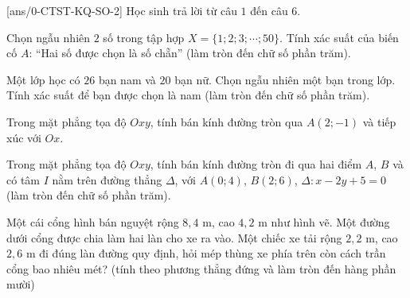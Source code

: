 \caukq
{}[ans/0-CTST-KQ-SO-2]
\setcounter{ex}{0}
Học sinh trả lời từ câu $1$ đến câu $6$.
\begin{ex}%
Chọn ngẫu nhiên $2$ số trong tập hợp $X=\{1;2;3;\cdots ; 50\}$. Tính xác suất của biến cố $A$: ``Hai số được chọn là số chẵn'' (làm tròn đến chữ số phần trăm).
	\loigiai{
	}
\end{ex}

\begin{ex}%
Một lớp học có $26$ bạn nam và $20$ bạn nữ. Chọn ngẫu nhiên một bạn trong lớp. Tính xác suất để bạn được chọn là nam (làm tròn đến chữ số phần trăm).
	\loigiai{
	}
\end{ex}

\begin{ex}%
Trong mặt phẳng tọa độ $Oxy$, tính bán kính đường tròn qua $A(2;-1)$ và tiếp xúc với $Ox$.

	\loigiai{
	}
\end{ex}

\begin{ex}%
Trong mặt phẳng tọa độ $Oxy$, tính bán kính đường tròn đi qua hai điểm $A$, $B$ và có tâm $I$ nằm trên đường thẳng $\Delta$, với $A(0;4)$, $B(2;6)$, $\Delta\colon x-2y+5=0$ (làm tròn đến chữ số phần trăm).
	
	\loigiai{
	}
\end{ex}

\begin{ex}%
Một cái cổng hình bán nguyệt rộng $8{,}4$ m, cao $4{,}2$ m như hình vẽ. Một đường dưới cổng được chia làm hai làn cho xe ra vào. Một chiếc xe tải rộng $2{,}2$ m, cao $2{,}6$ m đi đúng làn đường quy định, hỏi mép thùng xe phía trên còn cách trần cổng bao nhiêu mét? (tính theo phương thẳng đứng và làm tròn đến hàng phần mười)
\begin{center}
\end{center}
	\loigiai{
	}
\end{ex}


